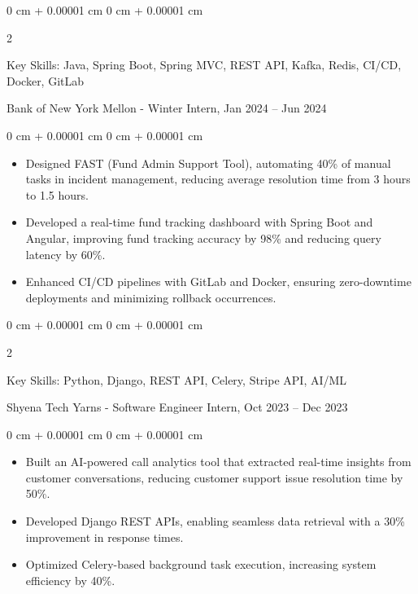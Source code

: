 \documentclass[10pt, letterpaper]{article}
\newenvironment{highlights}{
    \begin{itemize}[
        topsep=0.10 cm,
        parsep=0.10 cm,
        partopsep=0pt,
        itemsep=0pt,
        leftmargin=0 cm + 10pt
    ]
}{
    \end{itemize}
} %
\newenvironment{onecolentry}{
    \begin{adjustwidth}{
        0 cm + 0.00001 cm
    }{
        0 cm + 0.00001 cm
    }
}{
    \end{adjustwidth}
} %
\newenvironment{twocolentry}[2][]{
    \onecolentry
    \def\secondColumn{#2}
    \setcolumnwidth{\fill, 4.5 cm}
    \begin{paracol}{2}
}{
    \switchcolumn \raggedleft \secondColumn
    \end{paracol}
    \endonecolentry
} %
\begin{document}
        \vspace{0.2 cm}

        \begin{twocolentry}{
            Bank of New York Mellon - Winter Intern, Jan 2024 – Jun 2024
        }
            Key Skills: Java, Spring Boot, Spring MVC, REST API, Kafka, Redis, CI/CD, Docker, GitLab
        \end{twocolentry}

        \vspace{0.10 cm}
        \begin{onecolentry}
            \begin{highlights}
                \item Designed FAST (Fund Admin Support Tool), automating 40\% of manual tasks in incident management, reducing average resolution time from 3 hours to 1.5 hours.
                \item Developed a real-time fund tracking dashboard with Spring Boot and Angular, improving fund tracking accuracy by 98\% and reducing query latency by 60\%.
                \item Enhanced CI/CD pipelines with GitLab and Docker, ensuring zero-downtime deployments and minimizing rollback occurrences.
            \end{highlights}
        \end{onecolentry}

        \vspace{0.2 cm}

        \begin{twocolentry}{
            Shyena Tech Yarns - Software Engineer Intern, Oct 2023 – Dec 2023
        }
            Key Skills: Python, Django, REST API, Celery, Stripe API, AI/ML
        \end{twocolentry}

        \vspace{0.10 cm}
        \begin{onecolentry}
            \begin{highlights}
                \item Built an AI-powered call analytics tool that extracted real-time insights from customer conversations, reducing customer support issue resolution time by 50\%.
                \item Developed Django REST APIs, enabling seamless data retrieval with a 30\% improvement in response times.
                \item Optimized Celery-based background task execution, increasing system efficiency by 40\%.
            \end{highlights}
        \end{onecolentry}
\end{document}
